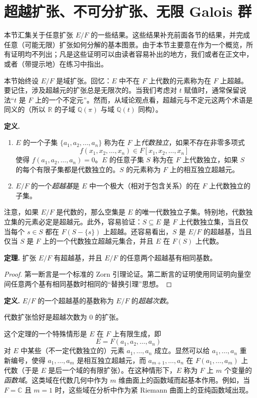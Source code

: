 \section{超越扩张、不可分扩张、无限 Galois 群}

本节汇集关于任意扩张 $E/F$ 的一些结果。这些结果补充前面各节的结果，并完成任意（可能无限）扩张如何分解的基本图景。由于本节主要意在作为一个概览，所有证明均不列出；凡是这些证明可以由读者容易补出的地方，我们或者在正文中，或者（带提示地）在练习中指出。

本节始终设 $E/F$ 是域扩张。回忆：$E$ 中不在 $F$ 上代数的元素称为在 $F$ 上超越。要记住，涉及超越元的扩张总是无限次的。当我们考虑对 $t$ 赋值时，通常保留说法“$t$ 是 $F$ 上的一个不定元”。然而，从域论观点看，超越元与不定元这两个术语是同义的（所以 $\mathbb R$ 的子域 $\mathbb Q(\pi)$ 与域 $\mathbb Q(t)$ 同构）。

\noindent\textbf{定义.}
\begin{enumerate}[label=(\arabic*)]
\item $E$ 的一个子集 $\{a_1,a_2,\ldots,a_n\}$ 称为在 $F$ 上\emph{代数独立}，如果不存在非零多项式
\[
 f(x_1,x_2,\ldots,x_n)\in F[x_1,x_2,\ldots,x_n]
\]
使得 $f(a_1,a_2,\ldots,a_n)=0$。$E$ 的任意子集 $S$ 称为在 $F$ 上代数独立，如果 $S$ 的每个有限子集都是代数独立的。$S$ 的元素称为 $F$ 上的相互独立超越元。
\item $E/F$ 的一个\emph{超越基}是 $E$ 中一个极大（相对于包含关系）的在 $F$ 上代数独立的子集。
\end{enumerate}

注意，如果 $E/F$ 是代数的，那么空集是 $E$ 的唯一代数独立子集。特别地，代数独立集的元素必定是超越元。此外，容易验证：$S\subseteq E$ 是 $F$ 上代数独立集，当且仅当每个 $s\in S$ 都在 $F(S-\{s\})$ 上超越。还容易看出，$S$ 是 $E/F$ 的超越基，当且仅当 $S$ 是 $F$ 上的一个代数独立超越元集合，并且 $E$ 在 $F(S)$ 上代数。

\noindent\textbf{定理.} 扩张 $E/F$ 有超越基，并且 $E/F$ 的任意两个超越基有相同基数。

\begin{proof}
第一断言是一个标准的 Zorn 引理论证。第二断言的证明使用同证明向量空间任意两个基有相同基数时相同的“替换引理”思想。
\end{proof}

\noindent\textbf{定义.} $E/F$ 的一个超越基的基数称为 $E/F$ 的\emph{超越次数}。

代数扩张恰好是超越次数为 $0$ 的扩张。

这个定理的一个特殊情形是 $E$ 在 $F$ 上有限生成，即
\[
E=F(a_1,a_2,\ldots,a_n)
\]
对 $E$ 中某些（不一定代数独立的）元素 $a_1,\ldots,a_n$ 成立。显然可以给 $a_1,\ldots,a_n$ 重新编号，使得 $a_1,\ldots,a_m$ 是相互独立超越元，而 $a_{m+1},\ldots,a_n$ 在 $F(a_1,\ldots,a_m)$ 上代数（于是 $E$ 是后一个域的有限扩张）。在这种情形下，$E$ 称为 $F$ 上 $m$ 个变量的\emph{函数域}。这类域在代数几何中作为 $m$ 维曲面上的函数域而起基本作用。例如，当 $F=\mathbb C$ 且 $m=1$ 时，这些域在分析中作为紧 Riemann 曲面上的亚纯函数域出现。

